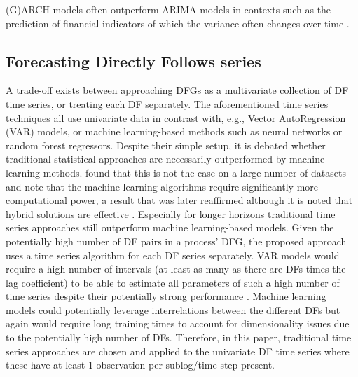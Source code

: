(G)ARCH models often outperform ARIMA models in contexts such as the prediction of financial indicators of which the variance often changes over time \cite{francq2019garch}.


\subsection{Forecasting Directly Follows series}
A trade-off exists between approaching DFGs as a multivariate collection of DF time series, or treating each DF separately.
The aforementioned time series techniques all use univariate data in contrast with, e.g., Vector AutoRegression (VAR) models, or machine learning-based methods such as neural networks or random forest regressors.
Despite their simple setup, it is debated whether traditional statistical approaches are necessarily outperformed by machine learning methods. 
\cite{makridakis2018statistical} found that this is not the case on a large number of datasets and note that the machine learning algorithms require significantly more computational power, a result that was later reaffirmed although it is noted that hybrid solutions are effective \cite{makridakis2020m4}.
Especially for longer horizons traditional time series approaches still outperform machine learning-based models.
Given the potentially high number of DF pairs in a process' DFG, the proposed approach uses a time series algorithm for each DF series separately.
VAR models would require a high number of intervals (at least as many as there are DFs times the lag coefficient) to be able to estimate all parameters of such a high number of time series despite their potentially strong performance \cite{thomakos2004naive}.
Machine learning models could potentially leverage interrelations between the different DFs but again would require long training times to account for dimensionality issues due to the potentially high number of DFs. Therefore, in this paper, traditional time series approaches are chosen and applied to the univariate DF time series where these have at least 1 observation per sublog/time step present.